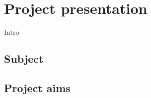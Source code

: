 \chapter{Project presentation}

Intro\footnotemark\\

\section{Subject}



{}


\newpage

\section{Project aims}